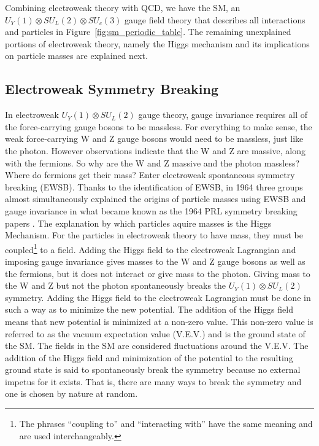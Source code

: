 Combining electroweak theory with QCD, we have the SM, an $U_{Y}(1) \otimes SU_{L}(2) \otimes SU_{c}(3)$ gauge field theory that describes all interactions and particles in
Figure~\ref{fig:sm_periodic_table}. The remaining unexplained portions of electroweak theory, namely the Higgs mechanism and its implications on particle masses are explained next.

\subsection{Electroweak Symmetry Breaking}

In electroweak $U_{Y}(1) \otimes SU_{L}(2)$ gauge theory, gauge invariance requires all of the force-carrying gauge bosons to be massless.
For everything to make sense, the weak force-carrying W and Z gauge bosons would need to be massless, just like the photon. 
However observations indicate that the W and Z are massive, along with the fermions.
So why are the W and Z massive and the photon massless? Where do fermions get their mass?
Enter electroweak spontaneous symmetry breaking (EWSB). Thanks to the identification of EWSB, in 1964 
three groups almost simultaneously explained the origins of particle masses using EWSB and gauge invariance in what became known as the 1964 PRL symmetry breaking papers
\cite{1964_prl_englert}\cite{1964_prl_higgs}\cite{1964_prl_guralnik}.
The explanation by which particles aquire masses is the Higgs Mechanism. For the particles in electroweak theory to have mass, they must be coupled\footnote{The phrases
``coupling to'' and ``interacting with'' have the same meaning and are used interchangeably.} to a field.
Adding the Higgs field to the electroweak Lagrangian and imposing gauge invariance gives masses to the W and Z gauge bosons as well as the fermions, but it does not interact
or give mass to the photon. Giving mass to the W and Z but not the photon spontaneously breaks the $U_{Y}(1) \otimes SU_{L}(2)$ symmetry.
Adding the Higgs field to the electroweak Lagrangian must be done in such a way as to minimize the new potential. The addition of the Higgs field means that new potential
is minimized at a non-zero value. This non-zero value is referred to as the vacuum expectation value (V.E.V.) and is the ground state of the SM.
The fields in the SM are considered fluctuations around the V.E.V. The addition of the Higgs field and minimization of the potential to the resulting ground state
is said to spontaneously break the symmetry because no external impetus for it exists. That is, there are many ways to break the symmetry and one is chosen by nature at random.
